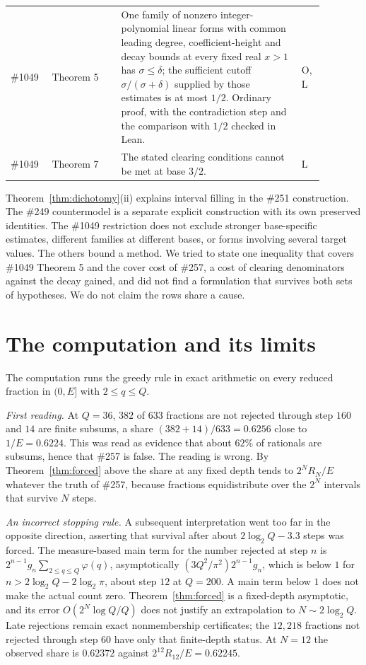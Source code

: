 \documentclass[11pt]{article}
\begin{document}
\begin{longtable}{p{0.10\linewidth}p{0.20\linewidth}p{0.52\linewidth}p{0.06\linewidth}}
\#1049 \cite{plectis1049} & Theorem 5 & One family of nonzero integer-polynomial linear forms with common leading degree, coefficient-height and decay bounds at every fixed real $x>1$ has $\sigma\le\delta$; the sufficient cutoff $\sigma/(\sigma+\delta)$ supplied by those estimates is at most $1/2$.  Ordinary proof, with the contradiction step and the comparison with $1/2$ checked in Lean. & O, L \\
\#1049 \cite{plectis1049} & Theorem 7 & The stated clearing conditions cannot be met at base $3/2$. & L \\
\hline
\end{longtable}

Theorem~\ref{thm:dichotomy}(ii) explains interval filling in the \#251 construction.
The \#249 countermodel is a separate explicit construction with its own
preserved identities.  The \#1049 restriction does not exclude stronger
base-specific estimates, different families at different bases, or forms
involving several target values.
The others bound a method.  We tried to state one inequality that covers
\#1049 Theorem 5 and the cover cost of \#257, a cost of clearing denominators
against the decay gained, and did not find a formulation that survives both
sets of hypotheses.  We do not claim the rows share a cause.


\section{The computation and its limits}\label{sec:misread}

The computation \cite{plectisinvestigation} runs the greedy rule in exact
arithmetic on every reduced fraction in $(0,E]$ with $2\le q\le Q$.

\emph{First reading.}  At $Q=36$, $382$ of $633$ fractions are not rejected
through step $160$ and $14$ are finite subsums, a share $(382+14)/633=0.6256$
close to $1/E=0.6224$.  This was read as evidence that about $62\%$ of rationals are
subsums, hence that \#257 is false.  The reading is wrong.  By Theorem~\ref{thm:forced} above the share at any fixed depth tends to $2^NR_N/E$ whatever the truth of
\#257, because fractions equidistribute over the $2^N$ intervals that survive
$N$ steps.

\emph{An incorrect stopping rule.}  A subsequent interpretation went too far
in the opposite direction, asserting that survival after about $2\log_2Q-3.3$
steps was forced.  The measure-based main term for the number rejected at step $n$ is
$2^{n-1}g_n\sum_{2\le q\le Q}\varphi(q)$, asymptotically
$(3Q^2/\pi^2)2^{n-1}g_n$, which is below $1$ for $n>2\log_2Q-2\log_2\pi$, about
step $12$ at $Q=200$.  A main term below $1$ does not make the actual count
zero.  Theorem~\ref{thm:forced} is a fixed-depth asymptotic, and its error
$O(2^N\log Q/Q)$ does not justify an extrapolation to $N\sim2\log_2Q$.
Late rejections remain exact nonmembership certificates; the $12{,}218$
fractions not rejected through step $60$ have only that finite-depth status.
At $N=12$ the observed share is $0.62372$ against
$2^{12}R_{12}/E=0.62245$.
\end{document}
